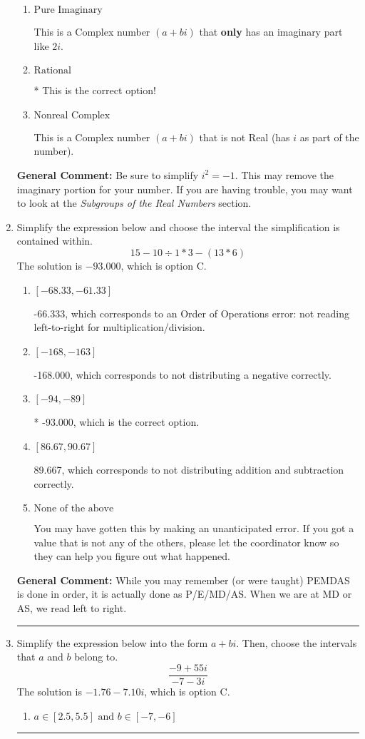 \documentclass{extbook}[14pt]
\newcommand{\litem}[1]{\item #1

\rule{\textwidth}{0.4pt}}
\begin{document}
\begin{enumerate}
{\begin{enumerate}[label=\Alph*.]
This is not a number. The only non-Complex number we know is dividing by 0 as this is not a number!
\item \( \text{Pure Imaginary} \)

This is a Complex number $(a+bi)$ that \textbf{only} has an imaginary part like $2i$.
\item \( \text{Rational} \)

* This is the correct option!
\item \( \text{Nonreal Complex} \)

This is a Complex number $(a+bi)$ that is not Real (has $i$ as part of the number).
\end{enumerate}

\textbf{General Comment:} Be sure to simplify $i^2 = -1$. This may remove the imaginary portion for your number. If you are having trouble, you may want to look at the \textit{Subgroups of the Real Numbers} section.
}
\litem{
Simplify the expression below and choose the interval the simplification is contained within.
\[ 15 - 10 \div 1 * 3 - (13 * 6) \]
The solution is \( -93.000 \), which is option C.\begin{enumerate}[label=\Alph*.]
\item \( [-68.33, -61.33] \)

 -66.333, which corresponds to an Order of Operations error: not reading left-to-right for multiplication/division.
\item \( [-168, -163] \)

 -168.000, which corresponds to not distributing a negative correctly.
\item \( [-94, -89] \)

* -93.000, which is the correct option.
\item \( [86.67, 90.67] \)

 89.667, which corresponds to not distributing addition and subtraction correctly.
\item \( \text{None of the above} \)

 You may have gotten this by making an unanticipated error. If you got a value that is not any of the others, please let the coordinator know so they can help you figure out what happened.
\end{enumerate}

\textbf{General Comment:} While you may remember (or were taught) PEMDAS is done in order, it is actually done as P/E/MD/AS. When we are at MD or AS, we read left to right.
}
\litem{
Simplify the expression below into the form $a+bi$. Then, choose the intervals that $a$ and $b$ belong to.
\[ \frac{-9 + 55 i}{-7 - 3 i} \]
The solution is \( -1.76  - 7.10 i \), which is option C.\begin{enumerate}[label=\Alph*.]
\item \( a \in [2.5, 5.5] \text{ and } b \in [-7, -6] \)


\end{enumerate}}
\end{enumerate}
\end{document}
